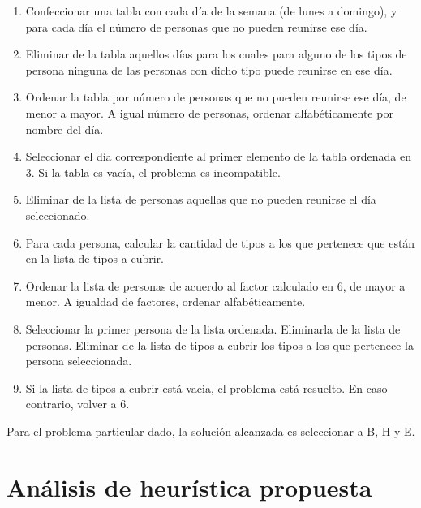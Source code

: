 \documentclass[a4paper,11pt]{article}
\begin{document}
\begin{enumerate}

  \item Confeccionar una tabla con cada día de la semana (de lunes a domingo),
    y para cada día el número de personas que no pueden reunirse ese día.

  \item Eliminar de la tabla aquellos días para los cuales para alguno de los
    tipos de persona ninguna de las personas con dicho tipo puede reunirse en
    ese día.

  \item Ordenar la tabla por número de personas que no pueden reunirse ese día,
    de menor a mayor. A igual número de personas, ordenar alfabéticamente por
    nombre del día.

  \item Seleccionar el día correspondiente al primer elemento de la tabla
    ordenada en 3. Si la tabla es vacía, el problema es incompatible.

  \item Eliminar de la lista de personas aquellas que no pueden reunirse el día
    seleccionado.

  \item Para cada persona, calcular la cantidad de tipos a los que pertenece
    que están en la lista de tipos a cubrir.

  \item Ordenar la lista de personas de acuerdo al factor calculado en 6, de
    mayor a menor. A igualdad de factores, ordenar alfabéticamente.

  \item Seleccionar la primer persona de la lista ordenada. Eliminarla de la
    lista de personas. Eliminar de la lista de tipos a cubrir los tipos a los
    que pertenece la persona seleccionada.

  \item Si la lista de tipos a cubrir está vacia, el problema está resuelto. En
    caso contrario, volver a 6.

\end{enumerate}

Para el problema particular dado, la solución alcanzada es seleccionar a B, H y E.

\section{Análisis de heurística propuesta}
\end{document}
